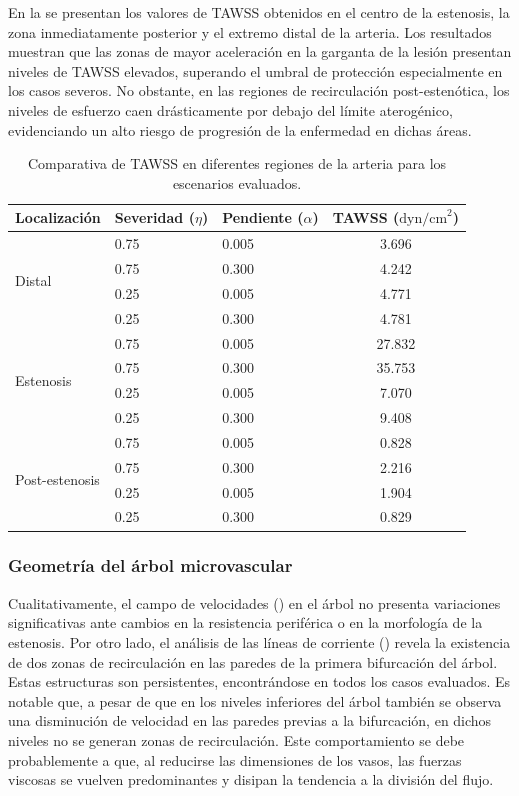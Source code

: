 \documentclass[12pt, letterpaper]{article}
\begin{document}
En la  se presentan los valores de TAWSS obtenidos en el centro de la estenosis, la zona inmediatamente posterior y el extremo distal de la arteria. Los resultados muestran que las zonas de mayor aceleración en la garganta de la lesión presentan niveles de TAWSS elevados, superando el umbral de protección especialmente en los casos severos. No obstante, en las regiones de recirculación post-estenótica, los niveles de esfuerzo caen drásticamente por debajo del límite aterogénico, evidenciando un alto riesgo de progresión de la enfermedad en dichas áreas.

\begin{table}[htbp]
  \centering
  \caption{Comparativa de TAWSS en diferentes regiones de la arteria para los escenarios evaluados.}
  \label{tab:tawss_comparativa}
  \begin{tabular}{lllc}
    \toprule
    \textbf{Localización} & \textbf{Severidad ($\eta$)} & \textbf{Pendiente ($\alpha$)} & \textbf{TAWSS ($\text{dyn/cm}^2$)} \\ \midrule
    \multirow{4}{*}{Distal} & 0.75 & 0.005 & 3.696 \\
    & 0.75 & 0.300 & 4.242 \\
    & 0.25 & 0.005 & 4.771 \\
    & 0.25 & 0.300 & 4.781 \\ \midrule
    \multirow{4}{*}{Estenosis} & 0.75 & 0.005 & 27.832 \\
    & 0.75 & 0.300 & 35.753 \\
    & 0.25 & 0.005 & 7.070 \\
    & 0.25 & 0.300 & 9.408 \\ \midrule
    \multirow{4}{*}{Post-estenosis} & 0.75 & 0.005 & 0.828 \\
    & 0.75 & 0.300 & 2.216 \\
    & 0.25 & 0.005 & 1.904 \\
    & 0.25 & 0.300 & 0.829 \\ \bottomrule
  \end{tabular}
\end{table}

\subsubsection{Geometría del árbol microvascular}


Cualitativamente, el campo de velocidades () en el árbol no presenta variaciones significativas ante cambios en la resistencia periférica o en la morfología de la estenosis. Por otro lado, el análisis de las líneas de corriente () revela la existencia de dos zonas de recirculación en las paredes de la primera bifurcación del árbol. Estas estructuras son persistentes, encontrándose en todos los casos evaluados. Es notable que, a pesar de que en los niveles inferiores del árbol también se observa una disminución de velocidad en las paredes previas a la bifurcación, en dichos niveles no se generan zonas de recirculación. Este comportamiento se debe probablemente a que, al reducirse las dimensiones de los vasos, las fuerzas viscosas se vuelven predominantes y disipan la tendencia a la división del flujo. 
\end{document}
